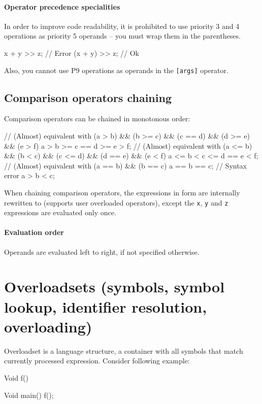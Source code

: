 \paragraph{Operator precedence specialities}
In order to improve code readability, it is prohibited to use priority 3 and 4 operations as priority 5 operands -- you must wrap them in the parentheses.
\begin{code}
x + y >> z; // Error
(x + y) >> z; // Ok
\end{code}

Also, you cannot use P9 operations as operands in the \verb|[args]| operator.

\subsection{Comparison operators chaining} Comparison operators can be chained in monotonous order:
\begin{code}
// (Almost) equivalent with (a > b) && (b >= c) && (c == d) && (d >= e) && (e > f)
a > b >= c == d >= e > f;
// (Almost) equivalent with (a <= b) && (b < c) && (c <= d) && (d == e) && (e < f)
a <= b < c <= d == e < f;
// (Almost) equivalent with (a == b) && (b == c)
a == b == c;
// Syntax error
a > b < c;
\end{code}

When chaining comparison operators, the expressions in form  are internally rewritten to  (supports user overloaded operators), except the \verb|x|, \verb|y| and \verb|z| expressions are evaluated only once.

\paragraph{Evaluation order}
Operands are evaluated left to right, if not specified otherwise.

\section{Overloadsets (symbols, symbol lookup, identifier resolution, overloading)}
Overloadset is a language structure, a container with all symbols that match currently processed expression. Consider following example:

\begin{code}
	Void f() {}$\label{codeLine:overloadSets1:fDecl}$
	
	Void main() {
		f();$\label{codeLine:overloadSets1:fCall}$	
	}
\end{code}

